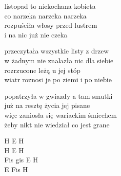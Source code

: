 \begin{text}
    listopad to niekochana kobieta\\
    co narzeka narzeka narzeka\\
    rozpuściła włosy przed lustrem\\
    i na nic już nie czeka

    przeczytała wszystkie listy z drzew\\
    w żadnym nie znalazła nic dla siebie\\
    rozrzucone leżą u jej stóp\\
    wiatr roznosi je po ziemi i po niebie

    popatrzyła w gwiazdy a tam smutki\\
    już na resztę życia jej pisane\\
    więc zaniosła się wariackim śmiechem\\
    żeby nikt nie wiedział co jest grane
\end{text}
\begin{chord}
    H E H\\
    H E H\\
    Fis gis E H\\
    E Fis H
\end{chord}
